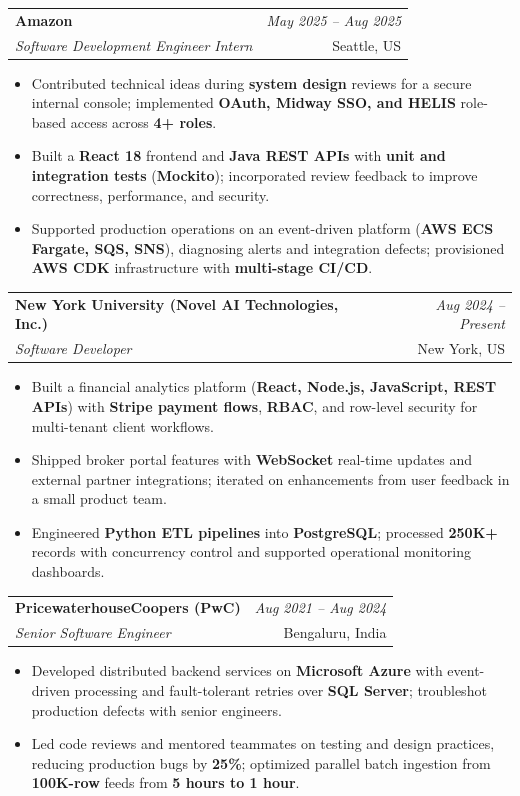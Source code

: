 \documentclass[a4paper,10pt]{article}
\makeatletter
\newcommand{\resumeSubheading}[4]{
\vspace{0.3mm}\item
    \begin{tabular*}{0.98\textwidth}[t]{l@{\extracolsep{\fill}}r}
        \textbf{#1} & \textit{\footnotesize{#4}} \\
        \textit{\footnotesize{#3}} & \footnotesize{#2}\\
    \end{tabular*}\vspace{-2mm}
}
\newcommand{\resumeItemListStart}{\begin{itemize}[leftmargin=*, labelsep=1mm, itemsep=0pt]}
\newcommand{\resumeItemListEnd}{\end{itemize}\vspace{-2mm}}
\makeatother
\begin{document}
\resumeSubheading
{Amazon}{Seattle, US}
{Software Development Engineer Intern}{May 2025 -- Aug 2025}
\resumeItemListStart
\item \footnotesize{Contributed technical ideas during \textbf{system design} reviews for a secure internal console; implemented \textbf{OAuth, Midway SSO, and HELIS} role-based access across \textbf{4+ roles}.}
\item \footnotesize{Built a \textbf{React 18} frontend and \textbf{Java REST APIs} with \textbf{unit and integration tests} (\textbf{Mockito}); incorporated review feedback to improve correctness, performance, and security.}
\item \footnotesize{Supported production operations on an event-driven platform (\textbf{AWS ECS Fargate, SQS, SNS}), diagnosing alerts and integration defects; provisioned \textbf{AWS CDK} infrastructure with \textbf{multi-stage CI/CD}.}
\resumeItemListEnd

\resumeSubheading
{New York University (Novel AI Technologies, Inc.)}{New York, US}
{Software Developer}{Aug 2024 -- Present}
\resumeItemListStart
\item \footnotesize{Built a financial analytics platform (\textbf{React, Node.js, JavaScript, REST APIs}) with \textbf{Stripe payment flows}, \textbf{RBAC}, and row-level security for multi-tenant client workflows.}
\item \footnotesize{Shipped broker portal features with \textbf{WebSocket} real-time updates and external partner integrations; iterated on enhancements from user feedback in a small product team.}
\item \footnotesize{Engineered \textbf{Python ETL pipelines} into \textbf{PostgreSQL}; processed \textbf{250K+} records with concurrency control and supported operational monitoring dashboards.}
\resumeItemListEnd

\resumeSubheading
{PricewaterhouseCoopers (PwC)}{Bengaluru, India}
{Senior Software Engineer}{Aug 2021 -- Aug 2024}
\resumeItemListStart
\item \footnotesize{Developed distributed backend services on \textbf{Microsoft Azure} with event-driven processing and fault-tolerant retries over \textbf{SQL Server}; troubleshot production defects with senior engineers.}
\item \footnotesize{Led code reviews and mentored teammates on testing and design practices, reducing production bugs by \textbf{25\%}; optimized parallel batch ingestion from \textbf{100K-row} feeds from \textbf{5 hours to 1 hour}.}
\resumeItemListEnd
\end{document}
